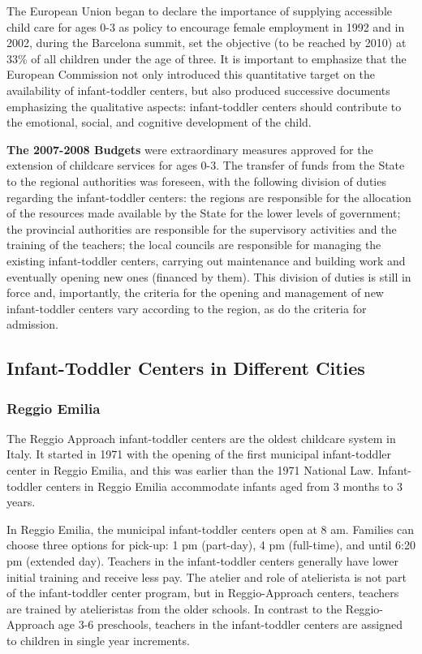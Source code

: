 The European Union began to declare the importance of supplying accessible child care for ages 0-3 as policy to encourage female employment in 1992 and in 2002, during the Barcelona summit, set the objective (to be reached by 2010) at 33\% of all children under the age of three. It is important to emphasize that the European Commission not only introduced this quantitative target on the availability of infant-toddler centers, but also produced successive documents emphasizing the qualitative aspects: infant-toddler centers should contribute to the emotional, social, and cognitive development of the child. 

\textbf{The 2007-2008 Budgets} were extraordinary measures approved for the extension of childcare services for ages 0-3. The transfer of funds from the State to the regional authorities was foreseen, with the following division of duties regarding the infant-toddler centers: the regions are responsible for the allocation of the resources made available by the State for the lower levels of government; the provincial authorities are responsible for the supervisory activities and the training of the teachers; the local councils are responsible for managing the existing infant-toddler centers, carrying out maintenance and building work and eventually opening new ones (financed by them). This division of duties is still in force and, importantly, the criteria for the opening and management of new infant-toddler centers vary according to the region, as do the criteria for admission. 


\subsection{Infant-Toddler Centers in Different Cities}
\subsubsection{Reggio Emilia}
The Reggio Approach infant-toddler centers are the oldest childcare system in Italy. It started in 1971 with the opening of the first municipal infant-toddler center in Reggio Emilia, and this was earlier than the 1971 National Law. Infant-toddler centers in Reggio Emilia accommodate infants aged from 3 months to 3 years. 

In Reggio Emilia, the municipal infant-toddler centers open at 8 am. Families can choose three options for pick-up: 1 pm (part-day), 4 pm (full-time), and until 6:20 pm (extended day). Teachers in the infant-toddler centers generally have lower initial training and receive less pay. The atelier and role of atelierista is not part of the infant-toddler center program, but in Reggio-Approach centers, teachers are trained by atelieristas from the older schools. In contrast to the Reggio-Approach age 3-6 preschools, teachers in the infant-toddler centers are assigned to children in single year increments.  

